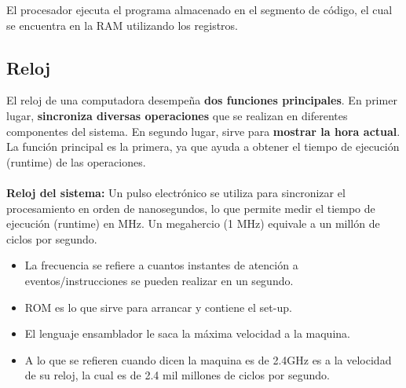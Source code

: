 \documentclass{templateNote}
\begin{document}
\noindent El procesador ejecuta el programa almacenado en el segmento de código, el cual se encuentra en la RAM utilizando los registros.

\subsection{Reloj}
\noindent El reloj de una computadora desempeña \textbf{dos funciones principales}. En primer lugar, \textbf{sincroniza diversas operaciones} que se realizan en diferentes componentes del sistema. 
En segundo lugar, sirve para \textbf{mostrar la hora actual}. La función principal es la primera, ya que ayuda a obtener el tiempo de ejecución (runtime) de las operaciones. \\\\
\textbf{Reloj del sistema:} Un pulso electrónico se utiliza para sincronizar el procesamiento en orden de nanosegundos, lo que permite medir el tiempo de ejecución (runtime) en MHz. 
Un megahercio (1 MHz) equivale a un millón de ciclos por segundo. 

\begin{tcolorbox}[colback=orange!10!white,colframe=orange!75!black,title=Observaciones]
    \begin{itemize}
        \item La frecuencia se refiere a cuantos instantes de atención a eventos/instrucciones se pueden realizar en un segundo.
        \item ROM es lo que sirve para arrancar y contiene el set-up.
        \item El lenguaje ensamblador le saca la máxima velocidad a la maquina.
        \item A lo que se refieren cuando dicen la maquina es de 2.4GHz es a la velocidad de su reloj, la cual es de 2.4 mil millones de ciclos por segundo.
    \end{itemize}
\end{tcolorbox}
\newpage
\end{document}

